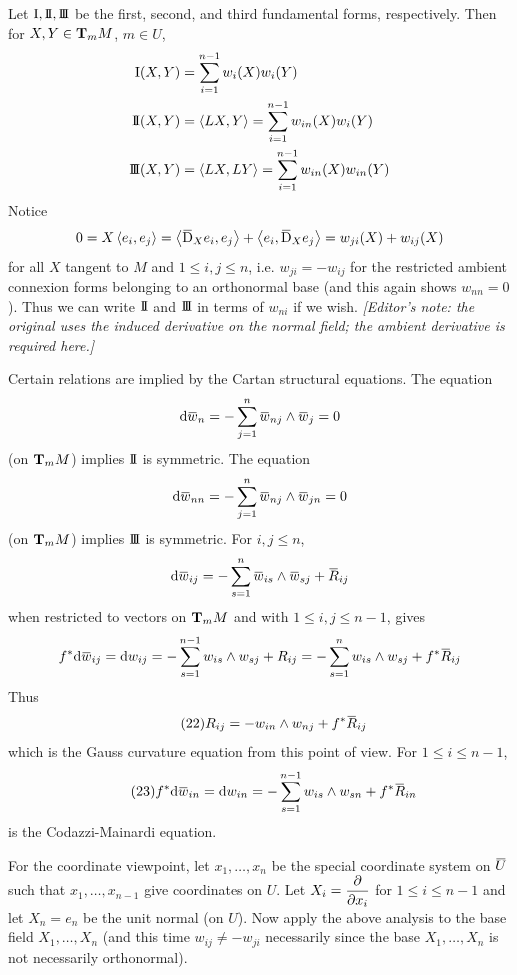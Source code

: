 \documentclass[../main]{subfiles}
\begin{document}
Let $\firstForm,\secondForm,\thirdForm$ be the first, second, and third fundamental forms, respectively. Then for $X,Y\in\ts Mm$, $m\in U$,
\begin{align*}
    \firstForm(X,Y) &= \sum_{i=1}^{n-1} w_i(X)w_i(Y) \\
    \secondForm(X,Y) &= \ip{LX}{Y} = \sum_{i=1}^{n-1} w_{in}(X)w_i(Y) \\
    \thirdForm(X,Y) &= \ip{LX}{LY} = \sum_{i=1}^{n-1} w_{in}(X)w_{in}(Y)
\end{align*}
Notice
\[0 = X\ip{e_i}{e_j} = \ip{\covariant_Xe_i}{e_j} + \ip{e_i}{\covariant_Xe_j} = w_{ji}(X) + w_{ij}(X)\]
for all $X$ tangent to $M$ and $1\le i,j\le n$, i.e. $w_{ji}=-w_{ij}$ for the restricted ambient connexion forms belonging to an orthonormal base (and this again shows $w_{nn}=0$). Thus we can write $\secondForm$ and $\thirdForm$ in terms of $w_{ni}$ if we wish. \emph{[Editor's note: the original uses the induced derivative on the normal field; the ambient derivative is required here.]}

Certain relations are implied by the Cartan structural equations. The equation
\[\dd\xoverline w_n = -\sum_{j=1}^n\xoverline w_{nj}\wedge\xoverline w_j = 0\]
(on $\ts Mm$) implies $\secondForm$ is symmetric. The equation
\[\dd\xoverline w_{nn} = -\sum_{j=1}^n\xoverline w_{nj}\wedge\xoverline w_{jn} = 0\]
(on $\ts Mm$) implies $\thirdForm$ is symmetric. For $i,j\le n$,
\[\dd\xoverline w_{ij} = -\sum_{s=1}^n\xoverline w_{is}\wedge\xoverline w_{sj} + \xoverline R_{ij}\]
when restricted to vectors on $\ts Mm$ and with $1\le i,j\le n-1$, gives
\[f^*\dd\xoverline w_{ij} = \dd w_{ij}
= -\sum_{s=1}^{n-1} w_{is}\wedge w_{sj} + R_{ij}
= -\sum_{s=1}^n w_{is}\wedge w_{sj} + f^*\xoverline R_{ij}\]
Thus
\begin{equation}\tag{22} \label{eqn:ch6.6.5}
    R_{ij} = -w_{in}\wedge w_{nj} + f^*\xoverline R_{ij}
\end{equation}
which is the Gauss curvature equation from this point of view. For $1\le i\le n-1$,
\begin{equation}\tag{23} \label{eqn:6.23}
    f^*\dd\xoverline w_{in} = \dd w_{in} = -\sum_{s=1}^{n-1} w_{is}\wedge w_{sn} + f^*\xoverline R_{in}
\end{equation}
is the Codazzi-Mainardi equation.

For the coordinate viewpoint, let $x_1,\ldots,x_n$ be the special coordinate system on $\xoverline U$ such that $x_1,\ldots,x_{n-1}$ give coordinates on $U$. Let $X_i=\pdv{}{x_i}$ for $1\le i\le n-1$ and let $X_n=e_n$ be the unit normal (on $U$). Now apply the above analysis to the base field $X_1,\ldots,X_n$ (and this time  $w_{ij}\ne -w_{ji}$ necessarily since the base $X_1,\ldots,X_n$ is not necessarily orthonormal).
\end{document}

